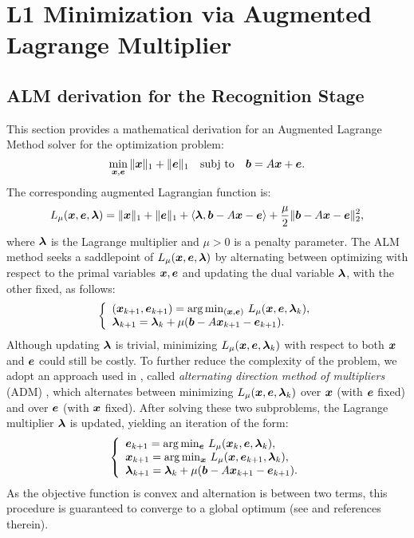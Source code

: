 \section{L1 Minimization via Augmented Lagrange Multiplier} 
\label{sec:alm_derivation}

\subsection{ALM derivation for the Recognition Stage}
This section provides a mathematical derivation for an Augmented Lagrange Method solver
for the optimization problem:
\begin{equation}
\min_{{\boldsymbol{x}}, \boldsymbol{e}} \| {\boldsymbol{x}} \|_1 + \|\boldsymbol{e}\|_1 \quad \textup{subj to} \quad \boldsymbol{b} =
A {\boldsymbol{x}} + \boldsymbol{e}.
\label{eqn:l1min_denoise}
\end{equation}
The corresponding augmented Lagrangian function is:
\begin{equation}
L_\mu ({\boldsymbol{x}},\boldsymbol{e},\boldsymbol{\lambda}) = \|{\boldsymbol{x}}\|_1 + \|\boldsymbol{e}\|_1 + \langle \boldsymbol{\lambda}, \boldsymbol{b}-A{\boldsymbol{x}} - \boldsymbol{e} \rangle + \frac{\mu}{2} \|\boldsymbol{b} - A{\boldsymbol{x}} - \boldsymbol{e}\|_2^2,
\end{equation}
where $\boldsymbol{\lambda}$ is the Lagrange multiplier and $\mu > 0$ is a
penalty parameter. The ALM method seeks a saddlepoint of $L_\mu
({\boldsymbol{x}},\boldsymbol{e},\boldsymbol{\lambda})$ by alternating between optimizing with respect
to the primal variables ${\boldsymbol{x}}, \boldsymbol{e}$ and updating the dual variable
$\boldsymbol{\lambda}$, with the other fixed, as follows:
\begin{equation}
\left \{
\begin{array}{lll}
({\boldsymbol{x}}_{k+1},\boldsymbol{e}_{k+1})  =  \arg\min_{({\boldsymbol{x}},\boldsymbol{e})} \, L_{\mu} ({\boldsymbol{x}},\boldsymbol{e},\boldsymbol{\lambda}_k),\\
\boldsymbol{\lambda}_{k+1}  =  \boldsymbol{\lambda}_k + \mu (\boldsymbol{b} - A{\boldsymbol{x}}_{k+1} - \boldsymbol{e}_{k+1}). \\
\end{array}
\right .
\label{eqn:alm}
\end{equation}
Although updating $\boldsymbol{\lambda}$ is trivial,
minimizing $L_{\mu} ({\boldsymbol{x}},\boldsymbol{e},\boldsymbol{\lambda}_k)$ with respect to both
${\boldsymbol{x}}$ and $\boldsymbol{e}$ could still be costly. To further reduce the
complexity of the problem, we adopt an approach used in
\cite{YangJ2009-pp}, called \emph{alternating direction
method of multipliers} (ADM) \cite{Glowinski1975-TR}, which alternates between minimizing $L_{\mu} ({\boldsymbol{x}},\boldsymbol{e},\boldsymbol{\lambda}_k)$
over ${\boldsymbol{x}}$ (with $\boldsymbol{e}$ fixed) and over $\boldsymbol{e}$ (with ${\boldsymbol{x}}$ fixed). After solving these two subproblems, the Lagrange multiplier $\boldsymbol{\lambda}$ is updated, yielding an iteration of the form:
\begin{equation}
\left \{
\begin{array}{lll}
\boldsymbol{e}_{k+1}  =  \arg\min_{\boldsymbol{e}} \, L_{\mu} ({\boldsymbol{x}}_k,\boldsymbol{e},\boldsymbol{\lambda}_k),\\
{\boldsymbol{x}}_{k+1}  =  \arg\min_{{\boldsymbol{x}}} \, L_{\mu} ({\boldsymbol{x}},\boldsymbol{e}_{k+1},\boldsymbol{\lambda}_k),\\
\boldsymbol{\lambda}_{k+1}  =  \boldsymbol{\lambda}_k + \mu (\boldsymbol{b} - A{\boldsymbol{x}}_{k+1} - \boldsymbol{e}_{k+1}). \\
\end{array}
\right .
\label{eqn:adm}
\end{equation}
As the objective function is convex and alternation is between two
terms, this procedure is guaranteed to converge to a global optimum (see \cite{YangJ2009-pp} and references therein).

